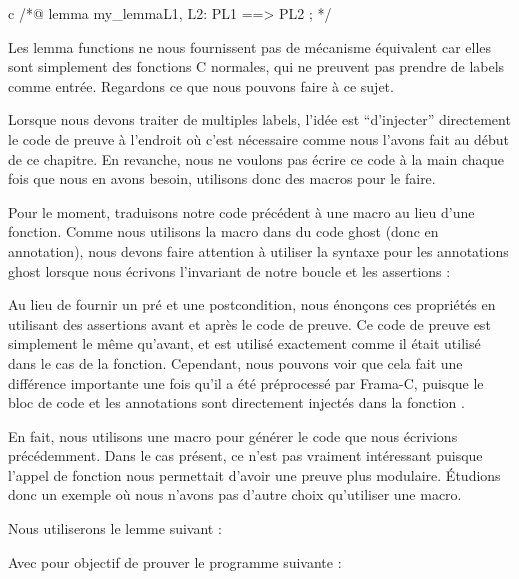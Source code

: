 \begin{CodeBlock}{c}
/*@
  lemma my_lemma{L1, L2}:  P{L1} ==> P{L2} ;
*/
\end{CodeBlock}


Les lemma functions ne nous fournissent pas de mécanisme équivalent car elles
sont simplement des fonctions C normales, qui ne preuvent pas prendre de
labels comme entrée. Regardons ce que nous pouvons faire à ce sujet.





Lorsque nous devons traiter de multiples labels, l'idée est ``d'injecter''
directement le code de preuve à l'endroit où c'est nécessaire comme nous 
l'avons fait au début de ce chapitre. En revanche, nous ne voulons pas écrire
ce code à la main chaque fois que nous en avons besoin, utilisons donc des
macros pour le faire.


Pour le moment, traduisons notre code précédent à une macro au lieu d'une
fonction. Comme nous utilisons la macro dans du code ghost (donc en annotation),
nous devons faire attention à utiliser la syntaxe pour les annotations ghost
lorsque nous écrivons l'invariant de notre boucle et les assertions :




Au lieu de fournir un pré et une postcondition, nous énonçons ces propriétés en
utilisant des assertions avant et après le code de preuve. Ce code de preuve est
simplement le même qu'avant, et est utilisé exactement comme il était utilisé dans
le cas de la fonction. Cependant, nous pouvons voir que cela fait une différence
importante une fois qu'il a été préprocessé par Frama-C, puisque le bloc de code
et les annotations sont directement injectés dans la fonction 
.




En fait, nous utilisons une macro pour générer le code que nous écrivions
précédemment. Dans le cas présent, ce n'est pas vraiment intéressant puisque
l'appel de fonction nous permettait d'avoir une preuve plus modulaire. Étudions
donc un exemple où nous n'avons pas d'autre choix qu'utiliser une macro.


Nous utiliserons le lemme suivant :




Avec pour objectif de prouver le programme suivante :




